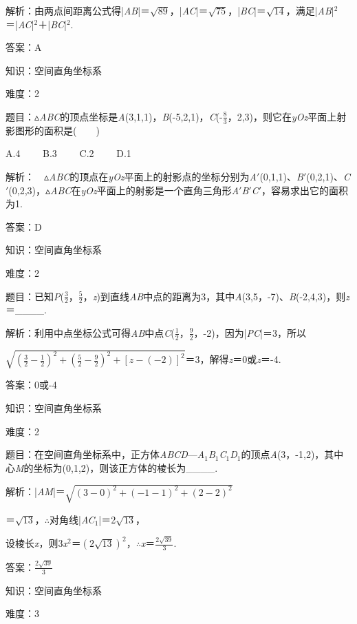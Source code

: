 \documentclass{article} %
\begin{document}
解析：由两点间距离公式得|\textit{AB}|＝$\sqrt{89}$，|\textit{AC}|＝$\sqrt{75}$，|\textit{BC}|＝$\sqrt{14}$，满足|\textit{AB}|${}^{2}$＝|\textit{AC}|${}^{2}$＋|\textit{BC}|${}^{2}$.

答案：A

知识：空间直角坐标系

难度：2

题目：$\mathrm{\vartriangle}$\textit{ABC}的顶点坐标是\textit{A}(3,1,1)，\textit{B}(-5,2,1)，\textit{C}(-$\frac{8}{3}$，2,3)，则它在\textit{yOz}平面上射影图形的面积是(　　)

A.4　　 B.3　　 C.2　　 D.1

解析：　$\mathrm{\vartriangle}$\textit{ABC}的顶点在\textit{yOz}平面上的射影点的坐标分别为\textit{A}$'$(0,1,1)、\textit{B}$'$(0,2,1)、\textit{C}$'$(0,2,3)，$\mathrm{\vartriangle}$\textit{ABC}在\textit{yOz}平面上的射影是一个直角三角形\textit{A}$'$\textit{B}$'$\textit{C}$'$，容易求出它的面积为1.

答案：D


知识：空间直角坐标系

难度：2

题目：已知\textit{P}($\frac{3}{2}$，$\frac{5}{2}$，\textit{z})到直线\textit{AB}中点的距离为3，其中\textit{A}(3,5，-7)、\textit{B}(-2,4,3)，则\textit{z}＝\_\_\_\_.

解析：利用中点坐标公式可得\textit{AB}中点\textit{C}($\frac{1}{2}$，$\frac{9}{2}$，-2)，因为|\textit{PC}|＝3，所以

$\sqrt{(\frac{3}{2}-\frac{1}{2})^2+(\frac{5}{2}-\frac{9}{2})^2+[z-(-2)]^2}$＝3，解得\textit{z}＝0或\textit{z}＝-4.

答案：0或-4

知识：空间直角坐标系

难度：2

题目：在空间直角坐标系中，正方体\textit{ABCD}---\textit{A}${}_{1}$\textit{B}${}_{1}$\textit{C}${}_{1}$\textit{D}${}_{1}$的顶点\textit{A}(3，-1,2)，其中心\textit{M}的坐标为(0,1,2)，则该正方体的棱长为\_\_\_\_.

解析：|\textit{AM}|＝$\sqrt{(3-0)^2+(-1-1)^2+(2-2)^2}$

＝$\sqrt{13}$，$\mathrm{\therefore}$对角线|\textit{AC}${}_{1}$|＝2$\sqrt{13}$，

设棱长\textit{x}，则3\textit{x}${}^{2}$＝$(2\sqrt{13})^2$，$\mathrm{\therefore}$\textit{x}＝$\frac{2\sqrt{39}}{3}$.

答案：$\frac{2\sqrt{39}}{3}$

知识：空间直角坐标系

难度：3
\end{document}
